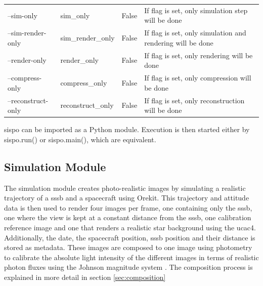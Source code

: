 \begin{table}[htpb]
\begin{tabular}{p{}|p{}|p{}|p{}}
\multicolumn{1}{l|}{--sim-only}          & sim\_only              & False                      & If flag is set, only simulation step will be done                                                                         \\
\multicolumn{1}{l|}{--sim-render-only}   & sim\_render\_only      & False                      & If flag is set, only simulation and rendering will be done                                                                \\
\multicolumn{1}{l|}{--render-only}       & render\_only           & False                      & If flag is set, only rendering will be done                                                                               \\
\multicolumn{1}{l|}{--compress-only}     & compress\_only         & False                      & If flag is set, only compression will be done                                                                             \\
\multicolumn{1}{l|}{--reconstruct-only}  & reconstruct\_only      & False                      & If flag is set, only reconstruction will be done                                                                         

\end{tabular}
\label{tab:cli_args}
\end{table}

\gls{sispo} can be imported as a Python module. Execution is then started either by sispo.run() or sispo.main(), which are equivalent.

\subsection{Simulation Module}
The simulation module creates photo-realistic images by simulating a realistic trajectory of a \gls{sssb} and a spacecraft using Orekit. This trajectory and attitude data is then used to render four images per frame, one containing only the \gls{sssb}, one where the view is kept at a constant distance from the \gls{sssb}, one calibration reference image and one that renders a realistic star background using the \gls{ucac4}. Additionally, the date, the spacecraft position, \gls{sssb} position and their distance is stored as metadata. These images are composed to one image using photometry to calibrate the absolute light intensity of the different images in terms of realistic photon fluxes using the Johnson magnitude system \cite{bessel1979ubvri}. The composition process is explained in more detail in section \ref{sec:composition}

